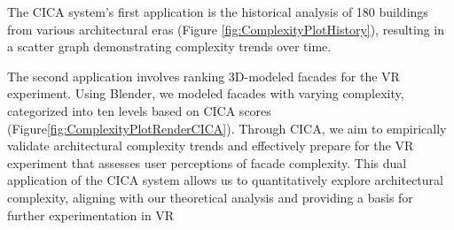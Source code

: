 The CICA system's first application is the historical analysis of 180 buildings from various architectural eras (Figure \ref{fig:ComplexityPlotHistory}), resulting in a scatter graph demonstrating complexity trends over time.

The second application involves ranking 3D-modeled facades for the VR experiment.
Using Blender, we modeled facades with varying complexity, categorized into ten levels based on CICA scores (Figure\ref{fig:ComplexityPlotRenderCICA}).
Through CICA, we aim to empirically validate architectural complexity trends and effectively prepare for the VR experiment that assesses user perceptions of facade complexity.
This dual application of the CICA system allows us to quantitatively explore architectural complexity, aligning with our theoretical analysis and providing a basis for further experimentation in VR


